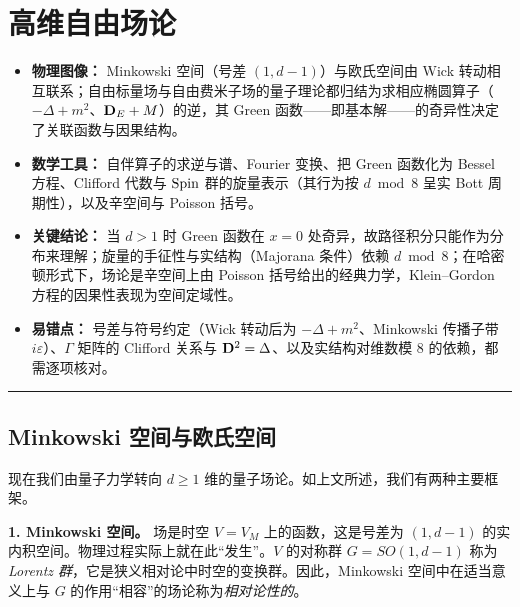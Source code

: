 
\section{高维自由场论}

\begin{keytakeaways}
\begin{itemize}
  \item \textbf{物理图像：} Minkowski 空间（号差 $(1,d-1)$）与欧氏空间由 Wick 转动相互联系；自由标量场与自由费米子场的量子理论都归结为求相应椭圆算子（$-\Delta+m^2$、$\bold D_E+M$）的逆，其 Green 函数——即基本解——的奇异性决定了关联函数与因果结构。
  \item \textbf{数学工具：} 自伴算子的求逆与谱、Fourier 变换、把 Green 函数化为 Bessel 方程、Clifford 代数与 ${\rm Spin}$ 群的旋量表示（其行为按 $d\bmod 8$ 呈实 Bott 周期性），以及辛空间与 Poisson 括号。
  \item \textbf{关键结论：} 当 $d>1$ 时 Green 函数在 $x=0$ 处奇异，故路径积分只能作为分布来理解；旋量的手征性与实结构（Majorana 条件）依赖 $d\bmod 8$；在哈密顿形式下，场论是辛空间上由 Poisson 括号给出的经典力学，Klein--Gordon 方程的因果性表现为空间定域性。
  \item \textbf{易错点：} 号差与符号约定（Wick 转动后为 $-\Delta+m^2$、Minkowski 传播子带 $i\varepsilon$）、$\Gamma$ 矩阵的 Clifford 关系与 $\bold D^2=\Delta$、以及实结构对维数模 $8$ 的依赖，都需逐项核对。
\end{itemize}
\end{keytakeaways}

\bigskip
\noindent\rule{\textwidth}{0.6pt}
\bigskip

\subsection{Minkowski 空间与欧氏空间}

现在我们由量子力学转向 $d\ge 1$ 维的量子场论。如上文所述，我们有两种主要框架。

\textbf{1. Minkowski 空间。} 场是时空 $V=V_M$ 上的函数，这是号差为 $(1,d-1)$ 的实内积空间。物理过程实际上就在此“发生”。$V$ 的对称群 $G=SO(1,d-1)$ 称为\emph{Lorentz 群}，它是狭义相对论中时空的变换群。因此，Minkowski 空间中在适当意义上与 $G$ 的作用“相容”的场论称为\emph{相对论性的}。

